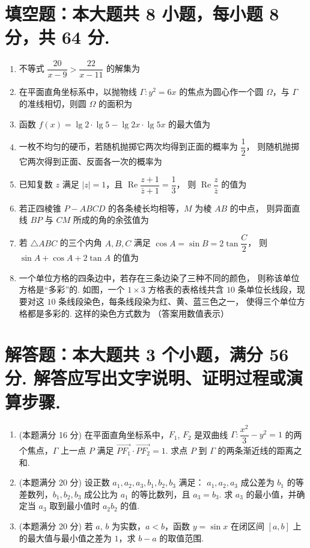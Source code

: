 \documentclass{chsmc}
\begin{document}
\section{填空题：本大题共 8 小题，每小题 8 分，共 64 分.}

\begin{enumerate}
  \item 不等式 $\dfrac{20}{x-9} > \dfrac{22}{x-11}$ 的解集为 \blankline
  \item 在平面直角坐标系中，以抛物线 $\Gamma\colon y^2 = 6x$ 的焦点为圆心作一个圆
    $\Omega$，与 $\Gamma$ 的准线相切，则圆 $\Omega$ 的面积为 \blankline
  \item 函数 $f(x) = \lg 2\cdot\lg 5 - \lg 2x\cdot\lg 5x$ 的最大值为 \blankline
  \item 一枚不均匀的硬币，若随机抛掷它两次均得到正面的概率为 $\dfrac{1}{2}$，
    则随机抛掷它两次得到正面、反面各一次的概率为 \blankline
  \item 已知复数 $z$ 满足 $|z| = 1$，且
    $\operatorname{Re}\dfrac{z+1}{\bar{z}+1} = \dfrac{1}{3}$，
    则 $\operatorname{Re}\dfrac{z}{\bar{z}}$ 的值为 \blankline
  \item 若正四棱锥 $P-ABCD$ 的各条棱长均相等，$M$ 为棱 $AB$ 的中点，
    则异面直线 $BP$ 与 $CM$ 所成的角的余弦值为 \blankline
  \item 若 $\triangle ABC$ 的三个内角 $A, B, C$ 满足
    $\cos A = \sin B = 2\tan\dfrac{C}{2}$，
    则 $\sin A + \cos A + 2\tan A$ 的值为 \blankline
  \item 一个单位方格的四条边中，若存在三条边染了三种不同的颜色，
    则称该单位方格是“多彩”的. 如图，一个 $1 \times 3$ 方格表的表格线共含
    $10$ 条单位长线段，现要对这 $10$ 条线段染色，每条线段染为红、黄、蓝三色之一，
    使得三个单位方格都是多彩的. 这样的染色方式数为 \blankline （答案用数值表示）
\end{enumerate}

\section{解答题：本大题共 3 个小题，满分 56 分. 解答应写出文字说明、证明过程或演算步骤.}

\begin{enumerate}[resume]
  \item (本题满分 16 分) 在平面直角坐标系中，$F_1$, $F_2$ 是双曲线
    $\Gamma\colon \dfrac{x^2}{3} - y^2 = 1$ 的两个焦点，$\Gamma$ 上一点 $P$
    满足 $\overrightarrow{PF_1}\cdot\overrightarrow{PF_2} = 1$.
    求点 $P$ 到 $\Gamma$ 的两条渐近线的距离之和.
  \item (本题满分 20 分) 设正数 $a_1, a_2, a_3, b_1, b_2, b_3$ 满足：
    $a_1, a_2, a_3$ 成公差为 $b_1$ 的等差数列，$b_1, b_2, b_3$ 成公比为 $a_1$
    的等比数列，且 $a_3 = b_3$. 求 $a_3$ 的最小值，并确定当 $a_3$ 取到最小值时
    $a_2 b_2$ 的值.
  \item (本题满分 20 分) 若 $a$, $b$ 为实数，$a < b$，函数 $y = \sin x$
    在闭区间 $[a,b]$ 上的最大值与最小值之差为 $1$，求 $b - a$ 的取值范围.
\end{enumerate}
\end{document}
